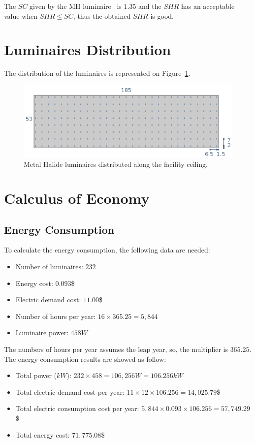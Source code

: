 The $SC$ given by the MH luminaire~\cite{www:mh_photometric} is $1.35$ and the $SHR$ has an acceptable value when $SHR \leq SC$, thus the obtained $SHR$ is good.

\section{Luminaires Distribution}
The distribution of the luminaires is represented on Figure~\ref{fig:mh_dist}.
\begin{figure}[h!]
\centering
\includegraphics[width=.9\textwidth]{./figs/mh_dist.png}
\caption{Metal Halide luminaires distributed along the facility ceiling.}
\label{fig:mh_dist}
\end{figure}

\section{Calculus of Economy}

\subsection{Energy Consumption}
To calculate the energy consumption, the following data are needed:
\begin{itemize}
\item Number of luminaires: $232$
\item Energy cost: $0.093$\$
\item Electric demand cost: $11.00$\$
\item Number of hours per year: $16 \times 365.25 = 5,844$
\item Luminaire power: $458 W$
\end{itemize}
The numbers of hours per year assumes the leap year, so, the multiplier is $365.25$. The energy consumption results are showed as follow:
\begin{itemize}
\item Total power ($kW$): $232 \times 458 = 106,256 W = 106.256 kW$
\item Total electric demand cost per year: $11 \times 12 \times 106.256 = 14,025.79$\$
\item Total electric consumption cost per year: $5,844 \times 0.093 \times 106.256 = 57,749.29$\$
\item Total energy cost: $71,775.08$\$
\end{itemize}

